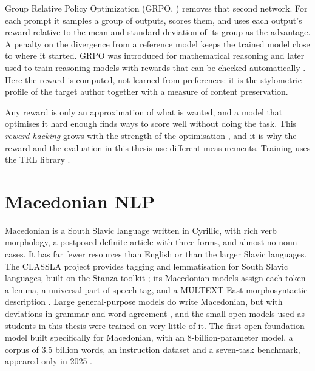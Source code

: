 Group Relative Policy Optimization (GRPO, \citealp{shao2024deepseekmath})
removes that second network. For each prompt it samples a group of
outputs, scores them, and uses each output's reward relative to the mean
and standard deviation of its group as the advantage. A penalty on the
divergence from a reference model keeps the trained model close to where
it started. GRPO was introduced for mathematical reasoning and later used
to train reasoning models with rewards that can be checked automatically
\citep{deepseek2025r1}. Here the reward is computed, not learned from
preferences: it is the stylometric profile of the target author together
with a measure of content preservation.

Any reward is only an approximation of what is wanted, and a model that
optimises it hard enough finds ways to score well without doing the task.
This \emph{reward hacking} \citep{skalse2022hacking} grows with the strength
of the optimisation \citep{gao2023overoptimization}, and it is why the
reward and the evaluation in this thesis use different measurements.
Training uses the TRL library \citep{vonwerra2020trl}.

\section{Macedonian NLP}

Macedonian is a South Slavic language written in Cyrillic, with rich verb
morphology, a postposed definite article with three forms, and almost no
noun cases. It has far fewer resources than English or than the larger
Slavic languages. The CLASSLA project provides tagging and lemmatisation
for South Slavic languages, built on the Stanza toolkit
\citep{qi2020stanza, ljubesic2019neural, tercon2023classla}; its
Macedonian models assign each token a lemma, a universal part-of-speech
tag, and a MULTEXT-East morphosyntactic description
\citep{erjavec2012multext}. Large general-purpose models do write
Macedonian, but with deviations in grammar and word agreement
\citep{arizankovska2024chatgpt}, and the small open models used as
students in this thesis were trained on very little of it.
The first open foundation model built specifically for Macedonian, with an
8-billion-parameter model, a corpus of 3.5 billion words, an instruction
dataset and a seven-task benchmark, appeared only in 2025
\citep{krsteski2025macedonian}.

